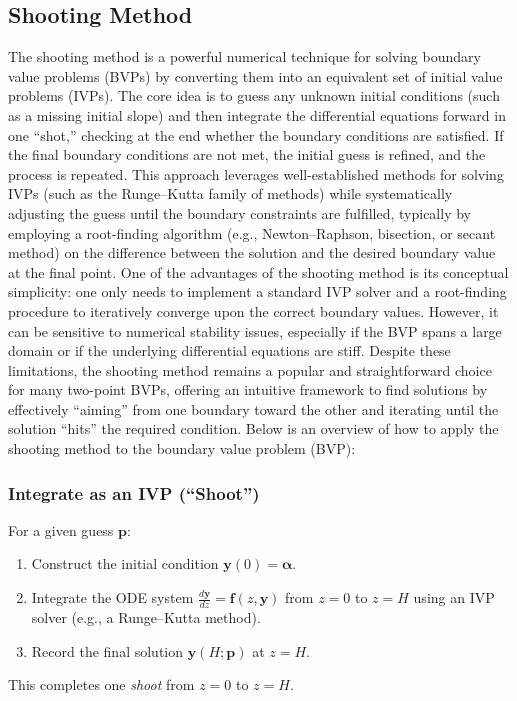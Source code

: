 \documentclass[a4paper,fleqn]{cas-sc}
\begin{document}
    \subsection{Shooting Method}
    The shooting method is a powerful numerical technique for solving boundary value problems (BVPs) by converting them into an equivalent set of initial value problems (IVPs). The core idea is to guess any unknown initial conditions (such as a missing initial slope) and then integrate the differential equations forward in one ``shot,'' checking at the end whether the boundary conditions are satisfied. If the final boundary conditions are not met, the initial guess is refined, and the process is repeated. This approach leverages well-established methods for solving IVPs (such as the Runge--Kutta family of methods) while systematically adjusting the guess until the boundary constraints are fulfilled, typically by employing a root-finding algorithm (e.g., Newton--Raphson, bisection, or secant method) on the difference between the solution and the desired boundary value at the final point. One of the advantages of the shooting method is its conceptual simplicity: one only needs to implement a standard IVP solver and a root-finding procedure to iteratively converge upon the correct boundary values. However, it can be sensitive to numerical stability issues, especially if the BVP spans a large domain or if the underlying differential equations are stiff. Despite these limitations, the shooting method remains a popular and straightforward choice for many two-point BVPs, offering an intuitive framework to find solutions by effectively ``aiming'' from one boundary toward the other and iterating until the solution ``hits'' the required condition. Below is an overview of how to apply the shooting method to the boundary value problem (BVP):

    \subsubsection*{Integrate as an IVP (``Shoot'')}
    For a given guess $\mathbf{p}$:
    \begin{enumerate}
        \item Construct the initial condition $\mathbf{y}(0) = \boldsymbol{\alpha}$.
        \item Integrate the ODE system $\frac{d\mathbf{y}}{dz} = \mathbf{f}(z,\mathbf{y})$ from $z=0$ to $z=H$ using an IVP solver (e.g., a Runge--Kutta method).
        \item Record the final solution $\mathbf{y}(H;\mathbf{p})$ at $z=H$.
    \end{enumerate}
    This completes one \emph{shoot} from $z=0$ to $z=H$.
\end{document}
